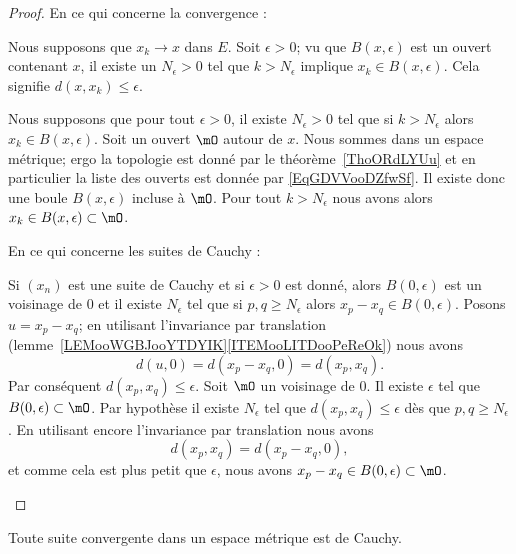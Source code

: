 \begin{proof}
	En ce qui concerne la convergence :
	\begin{subproof}

		Nous supposons que \( x_k\to x\) dans \( E\). Soit \( \epsilon>0\); vu que \( B(x,\epsilon)\) est un ouvert contenant \( x\), il existe un \( N_{\epsilon}>0 \) tel que \( k>N_{\epsilon}\) implique \( x_k\in B(x,\epsilon)\). Cela signifie \( d(x,x_k)\leq \epsilon\).

		\spitem[Réciproque]

		Nous supposons que pour tout \( \epsilon>0\), il existe \( N_{\epsilon}>0\) tel que si \( k>N_{\epsilon}\) alors \( x_k\in B(x,\epsilon)\). Soit un ouvert \( \mO\) autour de \( x\). Nous sommes dans un espace métrique; ergo la topologie est donné par le théorème~\ref{ThoORdLYUu} et en particulier la liste des ouverts est donnée par \eqref{EqGDVVooDZfwSf}. Il existe donc une boule \( B(x,\epsilon)\) incluse à \( \mO\). Pour tout \( k>N_{\epsilon}\) nous avons alors \( x_k\in B(x,\epsilon)\subset\mO\).
	\end{subproof}
	En ce qui concerne les suites de Cauchy :
	\begin{subproof}
		Si \( (x_n)\) est une suite de Cauchy et si \( \epsilon>0\) est donné, alors \( B(0,\epsilon)\) est un voisinage de \( 0\) et il existe \( N_{\epsilon}\) tel que si \( p,q\geq N_{\epsilon}\) alors \( x_p-x_q\in B(0,\epsilon)\). Posons \( u=x_p-x_q\); en utilisant l'invariance par translation (lemme~\ref{LEMooWGBJooYTDYIK}\ref{ITEMooLITDooPeReOk}) nous avons
		\begin{equation}
			d(u,0)=d(x_p-x_q,0)=d(x_p,x_q).
		\end{equation}
		Par conséquent \( d(x_p,x_q)\leq \epsilon\).
		\spitem[Réciproque]
		Soit \( \mO\) un voisinage de \( 0\). Il existe \( \epsilon\) tel que \( B(0,\epsilon)\subset \mO\). Par hypothèse il existe \( N_{\epsilon}\) tel que \( d(x_p,x_q)\leq \epsilon\) dès que \( p,q\geq N_{\epsilon}\). En utilisant encore l'invariance par translation nous avons
		\begin{equation}
			d(x_p,x_q)=d(x_p-x_q,0),
		\end{equation}
		et comme cela est plus petit que \( \epsilon\), nous avons \( x_p-x_q\in B(0,\epsilon)\subset\mO\).
	\end{subproof}
\end{proof}

\begin{proposition}     \label{PROPooZZNWooHghltd}
	Toute suite convergente dans un espace métrique est de Cauchy.
\end{proposition}

